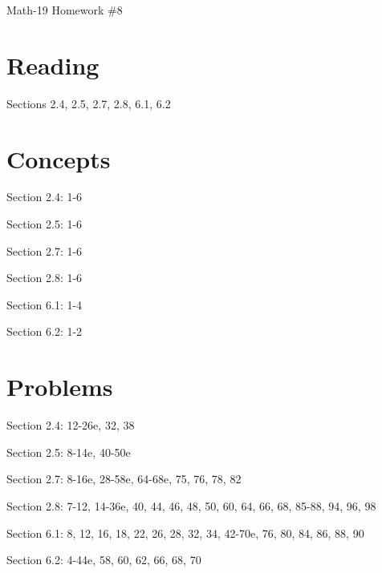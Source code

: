 \documentclass[letterpaper,12pt,fleqn]{article}
\begin{document}
\begin{center}
\Large Math-19 Homework \#8
\end{center}

\section*{Reading}

Sections 2.4, 2.5, 2.7, 2.8, 6.1, 6.2

\section*{Concepts}

Section 2.4: 1-6

Section 2.5: 1-6

Section 2.7: 1-6

Section 2.8: 1-6

Section 6.1: 1-4

Section 6.2: 1-2

\section*{Problems}

Section 2.4: 12-26e, 32, 38

Section 2.5: 8-14e, 40-50e

Section 2.7: 8-16e, 28-58e, 64-68e, 75, 76, 78, 82

Section 2.8: 7-12, 14-36e, 40, 44, 46, 48, 50, 60, 64, 66, 68, 85-88, 94, 96, 98

Section 6.1: 8, 12, 16, 18, 22, 26, 28, 32, 34, 42-70e, 76, 80, 84, 86, 88, 90

Section 6.2: 4-44e, 58, 60, 62, 66, 68, 70
\end{document}

